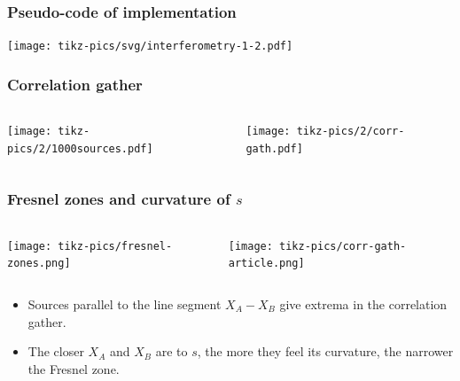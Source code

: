 \documentclass{beamer}
\begin{document}
\frame
{
\frametitle{{\bf Pseudo-code of implementation}}
\texttt{[image: tikz-pics/svg/interferometry-1-2.pdf]}
}
\frame
{
\centering
\color{norange}{\bf sensitivity}
}
\frame
{
\frametitle{{\bf Correlation gather}}
\begin{columns}
\begin{column}{0.5\textwidth}
\texttt{[image: tikz-pics/2/1000sources.pdf]}
\end{column}
\begin{column}{0.5\textwidth}
\texttt{[image: tikz-pics/2/corr-gath.pdf]}
\end{column}
\end{columns}
}
\frame
{
\frametitle{{\bf Fresnel zones and curvature of $s$}}
\begin{columns}
\begin{column}{0.4\textwidth}
\texttt{[image: tikz-pics/fresnel-zones.png]}
\end{column}
\begin{column}{0.4\textwidth}
\texttt{[image: tikz-pics/corr-gath-article.png]}
\end{column}
\end{columns}
\vspace{2em}
\begin{itemize}
\item Sources parallel to the line segment $X_A - X_B$ give extrema in the correlation gather.
\item The closer $X_A$ and $X_B$ are to $s$, the more they feel its curvature, the narrower the Fresnel zone.
\end{itemize}
\vfill
{}
}
\end{document}

